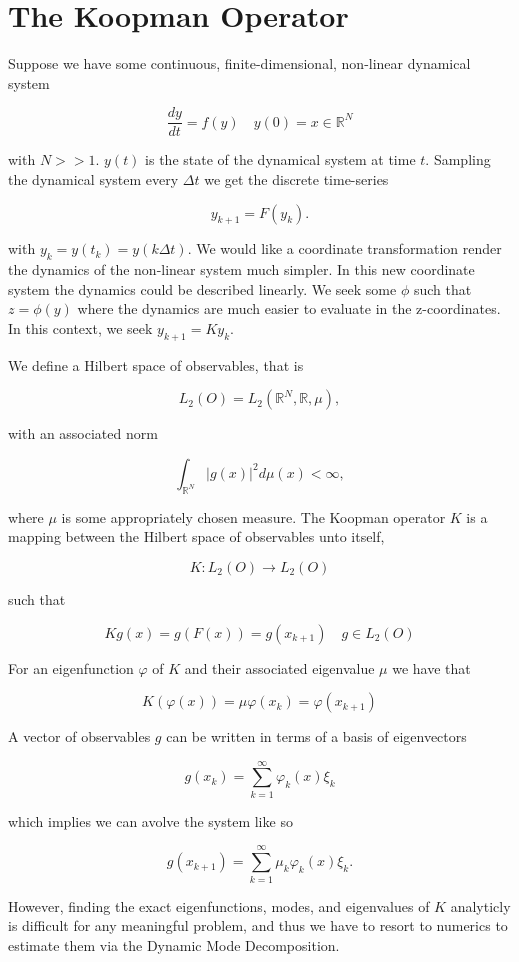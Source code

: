 \section{The Koopman Operator}
Suppose we have some continuous, finite-dimensional, non-linear dynamical system 

$$
\frac{dy}{dt} = f(y) \quad y(0) = x \in \mathbb{R}^N
$$

\noindent with $N>>1$. $y(t)$ is the state of the dynamical system at time $t$. Sampling the dynamical
system every $\Delta t$ we get the discrete time-series

$$
y_{k+1} = F(y_k).
$$

\noindent with $y_k = y(t_k) = y(k \Delta t)$. We would like a coordinate transformation render the dynamics of the
 non-linear system much simpler. In this new coordinate system the dynamics could be
described linearly. We seek some $\phi$ such
that $z = \phi(y)$ where the dynamics are much easier to evaluate in the
 z-coordinates. In this context, we seek $y_{k+1} = Ky_k$.


 \noindent We define a Hilbert space of observables, that is 

$$
L_2(O) = L_2(\mathbb{R}^N, \mathbb{R}, \mu),
$$

\noindent with an associated norm 

$$
\int_{\mathbb{R}^N} |g(x) |^2 d\mu(x)  < \infty,
$$

\noindent where $\mu$ is some appropriately chosen measure. The Koopman
operator $K$ is a mapping between the Hilbert space of observables unto itself,

$$
K: L_2(O) \rightarrow L_2(O)
$$

\noindent such that

$$
Kg(x) = g(F(x)) = g(x_{k+1}) \quad g \in L_2(O)
$$

\noindent For an eigenfunction $\varphi$ of $K$ and their associated eigenvalue $\mu$ we have that 


$$
K(\varphi(x)) = \mu \varphi(x_k) = \varphi(x_{k+1})
$$

\noindent A vector of observables $g$ can be written in terms of a basis of eigenvectors

$$
g(x_k) = \sum^{\infty}_{k=1}\varphi_k(x) \xi_k
$$

\noindent which implies we can avolve the system like so

$$
g(x_{k+1}) = \sum^{\infty}_{k=1} \mu_k \varphi_k(x) \xi_k.
$$

\noindent However, finding the exact eigenfunctions, modes, and eigenvalues of $K$ analyticly
is difficult for any meaningful problem, and thus we have to resort to
numerics to estimate them via the Dynamic Mode Decomposition.


